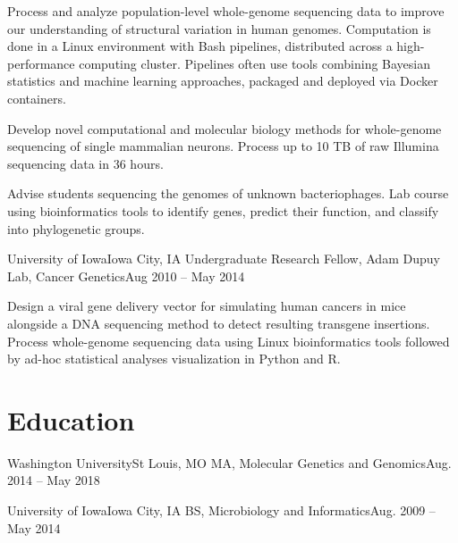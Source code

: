 {Process and analyze population-level whole-genome sequencing data to improve our understanding of structural variation in human genomes. Computation is done in a Linux environment with Bash pipelines, distributed across a high-performance computing cluster. Pipelines often use tools combining Bayesian statistics and machine learning approaches, packaged and deployed via Docker containers.}

{Develop novel computational and molecular biology methods for whole-genome sequencing of single mammalian neurons. Process up to 10 TB of raw Illumina sequencing data in 36 hours.}

{Advise students sequencing the genomes of unknown bacteriophages. Lab course using bioinformatics tools to identify genes, predict their function, and classify into phylogenetic groups.}

\resumeItemListEnd


\resumeSubheading
{University of Iowa}{Iowa City, IA}
{Undergraduate Research Fellow, Adam Dupuy Lab, Cancer Genetics}{Aug 2010 -- May 2014}

\resumeItemListStart

{Design a viral gene delivery vector for simulating human cancers in mice alongside a DNA sequencing method to detect resulting transgene insertions. Process whole-genome sequencing data using Linux bioinformatics tools followed by ad-hoc statistical analyses visualization in Python and R.}

\resumeItemListEnd

\resumeSubHeadingListEnd

\section{Education}
\resumeSubHeadingListStart

\resumeSubheading
{Washington University}{St Louis, MO}
{MA, Molecular Genetics and Genomics}{Aug. 2014 -- May 2018}

\resumeSubheading
{University of Iowa}{Iowa City, IA}
{BS, Microbiology and Informatics}{Aug. 2009 -- May 2014}

\resumeSubHeadingListEnd

